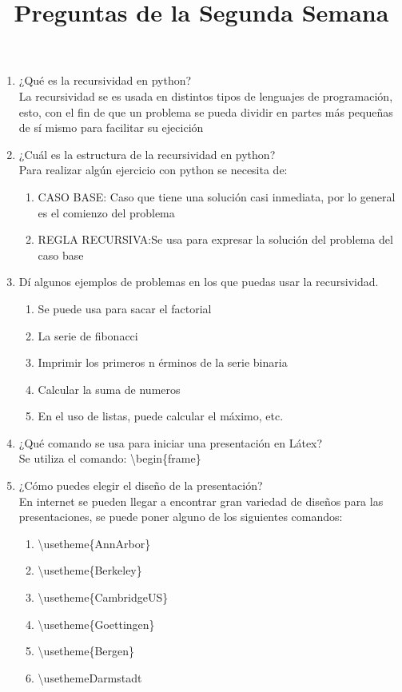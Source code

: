 \documentclass[letterpaper, 12pt, oneside]{article}%
\begin{document}
	\newpage
	\title {\huge Preguntas de la Segunda Semana }
	\begin{enumerate} 
		\item 
		¿Qué es la recursividad en python?\\
		La recursividad se es usada en distintos tipos de lenguajes de programación, esto, con el fin de que un problema se pueda dividir en partes más pequeñas de sí mismo para facilitar su ejecición 
		\item 
		¿Cuál es la estructura de la recursividad en python?\\ 
		Para realizar algún ejercicio con python se necesita de:
		\begin{enumerate}
			\item 
			CASO BASE: Caso que tiene una solución casi inmediata, por lo general es el comienzo del problema
			\item 
			REGLA RECURSIVA:Se usa para expresar la solución del problema del caso base
		\end{enumerate}
		\item 
		Dí algunos ejemplos de problemas en los que puedas usar la recursividad.
		\begin{enumerate}
			\item 
			Se puede usa para sacar el factorial
			\item 
			La serie de fibonacci
			\item 
			Imprimir los primeros n érminos de la serie binaria
			\item 
			Calcular la suma de numeros
			\item 
			En el uso de listas, puede calcular el máximo, etc.
		\end{enumerate}
		\item
		¿Qué comando se usa para iniciar una presentación en Látex?\\
		Se utiliza el comando: \textbackslash begin\{frame\} 
		\item 
		¿Cómo puedes elegir el diseño de la presentación?\\
		En internet se pueden llegar a encontrar gran variedad de diseños para las presentaciones, se puede poner alguno de los siguientes comandos:
		\begin{enumerate}
			\item 
			\textbackslash usetheme\{AnnArbor\}
			\item
			\textbackslash usetheme\{Berkeley\}
			\item
			\textbackslash usetheme\{CambridgeUS\}
			\item
			\textbackslash usetheme\{Goettingen\}
			\item 
			\textbackslash usetheme\{Bergen\} 
			\item
			\textbackslash usetheme{Darmstadt}
			

\end{enumerate}
\end{enumerate}
\end{document}
